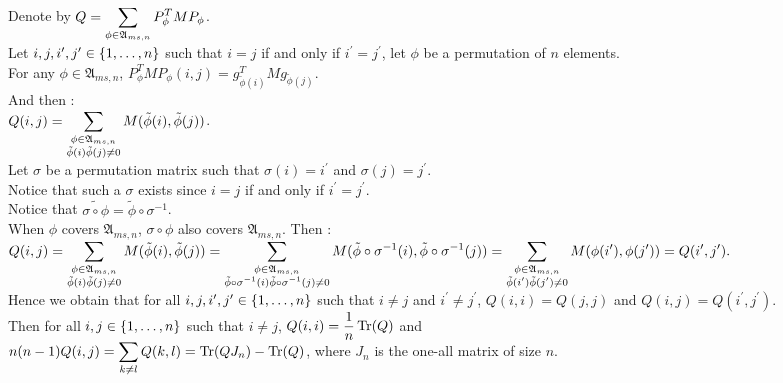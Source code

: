 Denote by $Q =\displaystyle\sum\limits_{\phi\in\mathfrak{A}_{ms,n}} P_{\phi}^{T} M P_{\phi}$.\\

Let $i,j,i^{\prime},j^{\prime} \in \left\{1,\dots,n\right\}$ such that $i = j$ if and only if $i^{\prime} = j^{\prime}$, let $\phi$ be a permutation of $n$ elements.\\

For any $\phi \in \mathfrak{A}_{ms,n}$, $P_{\phi}^{T}MP_{\phi}(i,j) = g_{\tilde{\phi}(i)}^{T}Mg_{\tilde{\phi}(j)}$.\\
And then :\\
$Q(i,j) = \displaystyle\sum\limits_{\substack{\phi\in\mathfrak{A}_{ms,n} \\ \tilde{\phi}(i)\tilde{\phi}(j)\neq0}} M(\tilde{\phi}(i),\tilde{\phi}(j))$.\\


Let $\sigma$ be a permutation matrix such that $\sigma(i) = i^{\prime}$ and $\sigma(j) = j^{\prime}$.\\
Notice that such a $\sigma$ exists since $i = j$ if and only if $i^{\prime} = j^{\prime}$.\\
Notice that $\widetilde{\sigma\circ\phi} = \tilde{\phi}\circ\sigma^{-1}$.\\
When $\phi$ covers $\mathfrak{A}_{ms,n}$, $\sigma\circ\phi$ also covers $\mathfrak{A}_{ms,n}$. Then :\\
$Q(i,j) = \displaystyle\sum\limits_{\substack{\phi\in\mathfrak{A}_{ms,n} \\ \tilde{\phi}(i)\tilde{\phi}(j)\neq0}} M(\tilde{\phi}(i),\tilde{\phi}(j)) =\displaystyle\sum\limits_{\substack{\phi\in\mathfrak{A}_{ms,n} \\ \tilde{\phi}\circ\sigma^{-1}(i)\tilde{\phi}\circ\sigma^{-1}(j)\neq0}} M(\tilde{\phi}\circ\sigma^{-1}(i),\tilde{\phi}\circ\sigma^{-1}(j)) = \displaystyle\sum\limits_{\substack{\phi\in\mathfrak{A}_{ms,n} \\ \tilde{\phi}(i^{\prime})\tilde{\phi}(j^{\prime})\neq0}} M(\phi(i^{\prime}),\phi(j^{\prime})) = Q(i^{\prime},j^{\prime}).$\\
Hence we obtain that for all $i,j,i^{\prime},j^{\prime} \in \left\{1,\dots,n\right\}$ such that $i \neq j$ and $i^{\prime} \neq j^{\prime}$, $Q(i,i) = Q(j,j)$ and $Q(i,j) = Q(i^{\prime},j^{\prime})$.\\
Then for all $i,j\in \left\{1,\dots,n\right\}$ such that $i\neq j$, $Q(i,i) = \displaystyle\frac{1}{n} \operatorname{Tr}(Q)$ and \\$n(n-1)Q(i,j) = \displaystyle\sum_{k\neq l} Q(k,l) = \operatorname{Tr}(QJ_{n})-\operatorname{Tr}(Q)$, where $J_{n}$ is the one-all matrix of size $n$.\\

